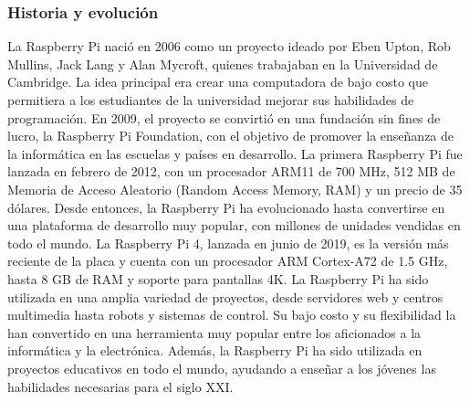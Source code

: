 \subsubsection{Historia y evoluci\'on}
    \label{subsubsection:historiaEvolucion}
    La Raspberry Pi naci\'o en 2006 como un proyecto ideado por Eben Upton, Rob Mullins, Jack Lang y Alan Mycroft, 
        quienes trabajaban en la Universidad de Cambridge. La idea principal era crear una computadora de bajo costo 
        que permitiera a los estudiantes de la universidad mejorar sus habilidades de programaci\'on. \cite{Santamaria2023}
        En 2009, el proyecto se convirti\'o en una fundaci\'on sin fines de lucro, la Raspberry Pi Foundation, 
        con el objetivo de promover la ense\~nanza de la inform\'atica en las escuelas y pa\'ises en desarrollo. \cite{Santamaria2023}
    \vskip 0.5cm
    La primera Raspberry Pi fue lanzada en febrero de 2012, con un procesador ARM11 de 700 MHz, 512 MB de Memoria de Acceso Aleatorio (Random Access Memory, RAM) y 
        un precio de 35 d\'olares. Desde entonces, la Raspberry Pi ha evolucionado hasta convertirse en una 
        plataforma de desarrollo muy popular, con millones de unidades vendidas en todo el mundo.\cite{Santamaria2023}
        La Raspberry Pi 4, lanzada en junio de 2019, es la versi\'on m\'as reciente de la placa y cuenta con un 
        procesador ARM Cortex-A72 de 1.5 GHz, hasta 8 GB de RAM y soporte para pantallas 4K. \cite{Santamaria2023}
    \vskip 0.5cm
    La Raspberry Pi ha sido utilizada en una amplia variedad de proyectos, desde servidores web y centros multimedia 
        hasta robots y sistemas de control. Su bajo costo y su flexibilidad la han convertido en una herramienta 
        muy popular entre los aficionados a la inform\'atica y la electr\'onica. Adem\'as, la Raspberry Pi ha sido 
        utilizada en proyectos educativos en todo el mundo, ayudando a ense\~nar a los j\'ovenes las habilidades 
        necesarias para el siglo XXI.
